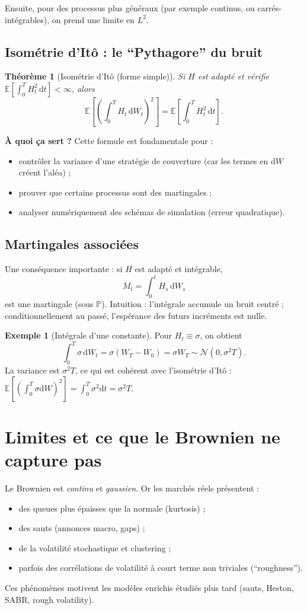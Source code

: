 \documentclass[11pt,a4paper]{report}
\newcommand{\dd}{\mathrm{d}}
\newcommand{\E}{\mathbb{E}}
\newcommand{\Prob}{\mathbb{P}}
\newcommand{\1}{\mathbbm{1}}
\newcommand{\Normal}{\mathcal{N}}
\theoremstyle{definition}
\newtheorem{example}{Exemple}[chapter]
\theoremstyle{plain}
\newtheorem{theorem}{Théorème}[chapter]
\theoremstyle{remark}
\begin{document}
Ensuite, pour des processus plus généraux (par exemple continus, ou carrés-intégrables), on prend une limite en $L^2$.

\subsection{Isométrie d'Itô : le ``Pythagore'' du bruit}
\begin{theorem}[Isométrie d'Itô (forme simple)]
Si $H$ est adapté et vérifie $\E\left[\int_0^T H_t^2\,\dd t\right]<\infty$, alors
\[
\E\left[\left(\int_0^T H_t\,\dd W_t\right)^2\right] = \E\left[\int_0^T H_t^2\,\dd t\right].
\]
\end{theorem}

\textbf{À quoi ça sert ?}
Cette formule est fondamentale pour :
\begin{itemize}
  \item contrôler la variance d'une stratégie de couverture (car les termes en $\dd W$ créent l'aléa) ;
  \item prouver que certains processus sont des martingales ;
  \item analyser numériquement des schémas de simulation (erreur quadratique).
\end{itemize}

\subsection{Martingales associées}
Une conséquence importante : si $H$ est adapté et intégrable,
\[
M_t=\int_0^t H_s\,\dd W_s
\]
est une martingale (sous $\Prob$). Intuition : l'intégrale accumule un bruit centré ; conditionnellement au passé, l'espérance des futurs incréments est nulle.

\begin{example}[Intégrale d'une constante]
Pour $H_t\equiv \sigma$, on obtient
\[
\int_0^T \sigma\,\dd W_t = \sigma (W_T - W_0)=\sigma W_T \sim \Normal(0,\sigma^2 T).
\]
La variance est $\sigma^2 T$, ce qui est cohérent avec l'isométrie d'Itô :
$\E[(\int_0^T \sigma \dd W)^2]=\int_0^T \sigma^2 \dd t=\sigma^2 T$.
\end{example}

\section{Limites et ce que le Brownien ne capture pas}
Le Brownien est \emph{continu} et \emph{gaussien}. Or les marchés réels présentent :
\begin{itemize}
  \item des queues plus épaisses que la normale (kurtosis) ;
  \item des sauts (annonces macro, gaps) ;
  \item de la volatilité stochastique et clustering ;
  \item parfois des corrélations de volatilité à court terme non triviales (``roughness'').
\end{itemize}
Ces phénomènes motivent les modèles enrichis étudiés plus tard (sauts, Heston, SABR, rough volatility).
\end{document}

